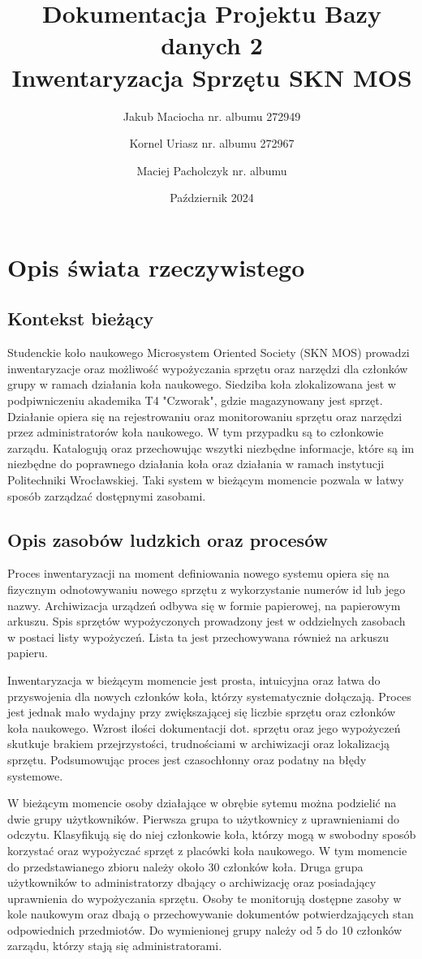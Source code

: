 \documentclass{article}
\title{Dokumentacja Projektu Bazy danych 2 \\ \large Inwentaryzacja Sprzętu SKN MOS }
\author{Jakub Maciocha nr. albumu 272949 \and Kornel Uriasz nr. albumu 272967 \and Maciej Pacholczyk nr. albumu}
\date{Październik 2024}
\begin{document}
\maketitle

\newpage
\section{Opis świata rzeczywistego}

    \subsection{Kontekst bieżący}
    Studenckie koło naukowego Microsystem Oriented Society (SKN MOS) prowadzi inwentaryzacje oraz możliwość wypożyczania sprzętu oraz narzędzi dla członków grupy w ramach działania koła naukowego. Siedziba koła zlokalizowana jest w podpiwniczeniu akademika T4 "Czworak", gdzie magazynowany jest sprzęt. Działanie opiera się na rejestrowaniu oraz monitorowaniu sprzętu oraz narzędzi przez administratorów koła naukowego. W tym przypadku są to członkowie zarządu. Katalogują oraz przechowując wszytki niezbędne informacje, które są im niezbędne do poprawnego działania koła oraz działania w ramach instytucji Politechniki Wrocławskiej. Taki system w bieżącym momencie pozwala w łatwy sposób zarządzać dostępnymi zasobami.

    \subsection{Opis zasobów ludzkich oraz procesów}
    Proces inwentaryzacji na moment definiowania nowego systemu opiera się na fizycznym odnotowywaniu nowego sprzętu z wykorzystanie numerów id lub jego nazwy. Archiwizacja urządzeń odbywa się w formie papierowej, na papierowym arkuszu. Spis sprzętów wypożyczonych prowadzony jest w oddzielnych zasobach w postaci listy  wypożyczeń. Lista ta jest przechowywana również na arkuszu papieru.
    
    Inwentaryzacja w bieżącym momencie jest prosta, intuicyjna oraz łatwa do przyswojenia dla nowych członków koła, którzy systematycznie dołączają. Proces jest jednak mało wydajny przy zwiększającej się liczbie sprzętu oraz członków koła naukowego. Wzrost ilości dokumentacji dot. sprzętu oraz jego wypożyczeń skutkuje brakiem przejrzystości, trudnościami w archiwizacji oraz lokalizacją sprzętu. Podsumowując proces jest czasochłonny oraz podatny na błędy systemowe.

    W bieżącym momencie osoby działające w obrębie sytemu można podzielić na dwie grupy użytkowników. Pierwsza grupa to użytkownicy z uprawnieniami do odczytu. Klasyfikują się do niej członkowie koła, którzy mogą w swobodny sposób korzystać oraz wypożyczać sprzęt z placówki koła naukowego. W tym momencie do przedstawianego zbioru należy około 30 członków koła. Druga grupa użytkowników to administratorzy dbający o archiwizację oraz posiadający uprawnienia do wypożyczania sprzętu. Osoby te monitorują dostępne zasoby w kole naukowym oraz dbają o przechowywanie dokumentów potwierdzających stan odpowiednich przedmiotów. Do wymienionej grupy należy od 5 do 10 członków zarządu, którzy stają się administratorami.
    
\end{document}
